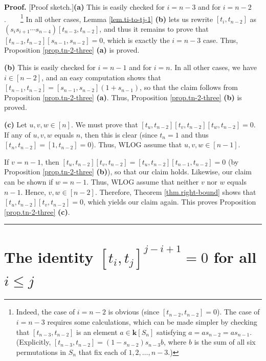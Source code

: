 \documentclass[numbers=enddot,12pt,final,onecolumn,notitlepage]{scrartcl}%
\theoremstyle{definition}
\newenvironment{proof}[1][Proof]{\noindent\textbf{#1.} }{\ \rule{0.5em}{0.5em}}
\begin{document}
\begin{proof}
[Proof sketch.]\textbf{(a)} This is easily checked for $i=n-3$ and for
$i=n-2$.\ \ \ \ \footnote{Indeed, the case of $i=n-2$ is obvious (since
$\left[  t_{n-2},t_{n-2}\right]  =0$). The case of $i=n-3$ requires some
calculations, which can be made simpler by checking that $\left[
t_{n-3},t_{n-2}\right]  $ is an element $a\in\mathbf{k}\left[  S_{n}\right]  $
satisfying $a=as_{n-2}=as_{n-1}$. (Explicitly, $\left[  t_{n-3},t_{n-2}%
\right]  =\left(  1-s_{n-2}\right)  s_{n-3}b$, where $b$ is the sum of all six
permutations in $S_{n}$ that fix each of $1,2,\ldots,n-3$.)} In all other
cases, Lemma \ref{lem.ti-to-tj-1} \textbf{(b)} lets us rewrite $\left[
t_{i},t_{n-2}\right]  $ as $\left(  s_{i}s_{i+1}\cdots s_{n-4}\right)  \left[
t_{n-3},t_{n-2}\right]  $, and thus it remains to prove that $\left[
t_{n-3},t_{n-2}\right]  \left[  s_{n-1},s_{n-2}\right]  =0$, which is exactly
the $i=n-3$ case. Thus, Proposition \ref{prop.tn-2-three} \textbf{(a)} is proved.

\textbf{(b)} This is easily checked for $i=n-1$ and for $i=n$. In all other
cases, we have $i\in\left[  n-2\right]  $, and an easy computation shows that
$\left[  t_{n-1},t_{n-2}\right]  =\left[  s_{n-1},s_{n-2}\right]  \left(
1+s_{n-1}\right)  $, so that the claim follows from Proposition
\ref{prop.tn-2-three} \textbf{(a)}. Thus, Proposition \ref{prop.tn-2-three}
\textbf{(b)} is proved.

\textbf{(c)} Let $u,v,w\in\left[  n\right]  $. We must prove that $\left[
t_{u},t_{n-2}\right]  \left[  t_{v},t_{n-2}\right]  \left[  t_{w}%
,t_{n-2}\right]  =0$. If any of $u,v,w$ equals $n$, then this is clear (since
$t_{n}=1$ and thus $\left[  t_{n},t_{n-2}\right]  =\left[  1,t_{n-2}\right]
=0$). Thus, WLOG assume that $u,v,w\in\left[  n-1\right]  $.

If $v=n-1$, then $\left[  t_{u},t_{n-2}\right]  \left[  t_{v},t_{n-2}\right]
=\left[  t_{u},t_{n-2}\right]  \left[  t_{n-1},t_{n-2}\right]  =0$ (by
Proposition \ref{prop.tn-2-three} \textbf{(b)}), so that our claim holds.
Likewise, our claim can be shown if $w=n-1$. Thus, WLOG assume that neither
$v$ nor $w$ equals $n-1$. Hence, $v,w\in\left[  n-2\right]  $. Therefore,
Theorem \ref{thm.right-bound} shows that $\left[  t_{u},t_{n-2}\right]
\left[  t_{v},t_{n-2}\right]  =0$, which yields our claim again. This proves
Proposition \ref{prop.tn-2-three} \textbf{(c)}.
\end{proof}

\section{The identity $\left[  t_{i},t_{j}\right]  ^{j-i+1}=0$ for all $i\leq
j$}
\end{document}
